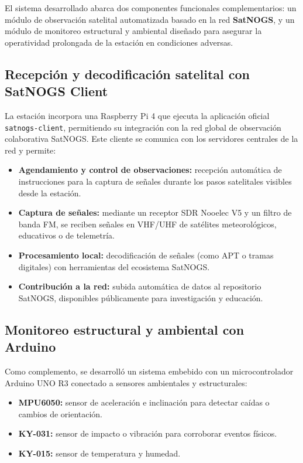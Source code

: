 \documentclass[conference]{IEEEtran}
\begin{document}
El sistema desarrollado abarca dos componentes funcionales complementarios: un módulo de observación satelital automatizada basado en la red \textbf{SatNOGS}, y un módulo de monitoreo estructural y ambiental diseñado para asegurar la operatividad prolongada de la estación en condiciones adversas.

\subsection{Recepción y decodificación satelital con SatNOGS Client}

La estación incorpora una Raspberry Pi 4 que ejecuta la aplicación oficial \texttt{satnogs-client}, permitiendo su integración con la red global de observación colaborativa SatNOGS. Este cliente se comunica con los servidores centrales de la red y permite:

\begin{itemize}
    \item \textbf{Agendamiento y control de observaciones:} recepción automática de instrucciones para la captura de señales durante los pasos satelitales visibles desde la estación.
    \item \textbf{Captura de señales:} mediante un receptor SDR Nooelec V5 y un filtro de banda FM, se reciben señales en VHF/UHF de satélites meteorológicos, educativos o de telemetría.
    \item \textbf{Procesamiento local:} decodificación de señales (como APT o tramas digitales) con herramientas del ecosistema SatNOGS.
    \item \textbf{Contribución a la red:} subida automática de datos al repositorio SatNOGS, disponibles públicamente para investigación y educación.
\end{itemize}

\subsection{Monitoreo estructural y ambiental con Arduino}

Como complemento, se desarrolló un sistema embebido con un microcontrolador Arduino UNO R3 conectado a sensores ambientales y estructurales:

\begin{itemize}
    \item \textbf{MPU6050:} sensor de aceleración e inclinación para detectar caídas o cambios de orientación.
    \item \textbf{KY-031:} sensor de impacto o vibración para corroborar eventos físicos.
    \item \textbf{KY-015:} sensor de temperatura y humedad.
\end{itemize}
\end{document}
